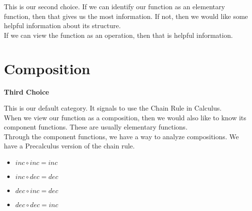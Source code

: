 \documentclass{ximera}
\begin{document}
This is our second choice.  If we can identify our function as an elementary function, then that gives us the most information. If not, then we would like some helpful information about its structure. \\



If we can view the function as an operation, then that is helpful information.\\







































\section{Composition}


\textbf{\textcolor{purple!85!blue}{Third Choice}} 

This is our default category.  It signals to use the Chain Rule in Calculus. \\


When we view our function as a composition, then we would also like to know its component functions. These are usually elementary functions. \\

Through the component functions, we have a way to analyze compositions.  We have a Precalculus version of the chain rule.


\begin{itemize}
\item  $inc \circ inc = inc$
\item  $inc \circ dec = dec$
\item  $dec \circ inc = dec$
\item  $dec \circ dec = inc$
\end{itemize}
\end{document}
